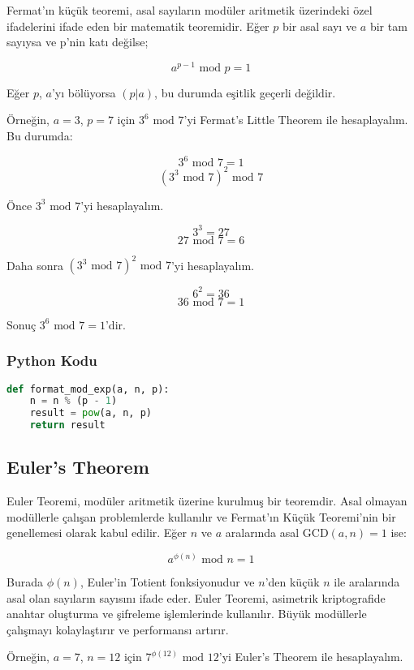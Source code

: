 Fermat'ın küçük teoremi, asal sayıların modüler aritmetik üzerindeki özel ifadelerini ifade eden bir matematik teoremidir. Eğer $p$ bir asal sayı ve $a$ bir tam sayıysa ve p'nin katı değilse;

\[ a^{p-1} \text{ mod } p = 1 \]

Eğer $p$, $a$'yı bölüyorsa $(p | a)$, bu durumda eşitlik geçerli değildir.

Örneğin, $a = 3$, $p = 7$ için $3^6 \text{ mod } 7$'yi Fermat's Little Theorem ile hesaplayalım. Bu durumda:

\[ 3^6 \text{ mod } 7 = 1 \]
\[ (3^3 \text{ mod } 7)^2 \text{ mod } 7 \]

Önce $3^3 \text{ mod } 7$'yi hesaplayalım.

\[ 3^3 = 27 \]
\[ 27 \text{ mod } 7 = 6 \]

Daha sonra $(3^3 \text{ mod } 7)^2 \text{ mod } 7$'yi hesaplayalım.

\[ 6^2 = 36 \]
\[ 36 \text{ mod } 7 = 1 \]

Sonuç $3^6 \text{ mod } 7 = 1$'dir.

\subsubsection{Python Kodu}

\begin{lstlisting}[language=Python]
def format_mod_exp(a, n, p):
    n = n % (p - 1)
    result = pow(a, n, p)
    return result
\end{lstlisting}

\newpage

\subsection{Euler's Theorem}

Euler Teoremi, modüler aritmetik üzerine kurulmuş bir teoremdir. Asal olmayan modüllerle çalışan problemlerde kullanılır ve Fermat'ın Küçük Teoremi'nin bir genellemesi olarak kabul edilir. Eğer $n$ ve $a$ aralarında asal $\text{GCD}(a, n) = 1$ ise:

\[ a^{\phi(n)} \text{ mod } n = 1 \]

Burada $\phi(n)$, Euler'in Totient fonksiyonudur ve $n$'den küçük $n$ ile aralarında asal olan sayıların sayısını ifade eder. Euler Teoremi, asimetrik kriptografide anahtar oluşturma ve şifreleme işlemlerinde kullanılır. Büyük modüllerle çalışmayı kolaylaştırır ve performansı artırır. 

Örneğin, $a = 7$, $n = 12$ için $7^{\phi(12)} \text{ mod } 12$'yi Euler's Theorem ile hesaplayalım.

